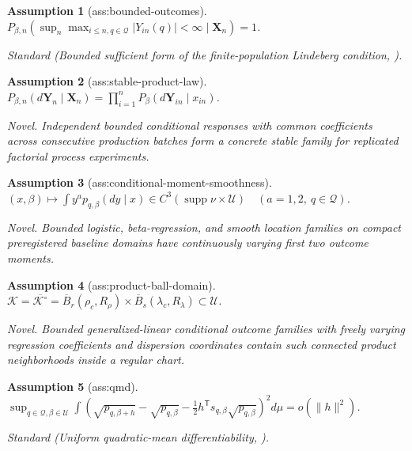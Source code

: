 \documentclass{article}
\newtheorem{assumption}{Assumption}
\begin{document}
\begin{assumption}[ass:bounded-outcomes]\label{ass:bounded-outcomes}
\(P_{\beta,n}(\sup_n\max_{i\le n,q\in\mathcal Q}|Y_{in}(q)|<\infty\mid\mathbf X_n)=1\).
\par\smallskip\noindent\emph{Standard} (Bounded sufficient form of the finite-population Lindeberg condition, \cite{LiDing2017FinitePopulationCLT}).
\end{assumption}

\begin{assumption}[ass:stable-product-law]\label{ass:stable-product-law}
\(P_{\beta,n}(d\mathbf Y_n\mid\mathbf X_n)=\prod_{i=1}^{n}P_{\beta}(d\mathbf Y_{in}\mid x_{in})\).
\par\smallskip\noindent\emph{Novel.} Independent bounded conditional responses with common coefficients across consecutive production batches form a concrete stable family for replicated factorial process experiments.
\end{assumption}

\begin{assumption}[ass:conditional-moment-smoothness]\label{ass:conditional-moment-smoothness}
\((x,\beta)\mapsto\int y^a p_{q,\beta}(dy\mid x)\in C^3(\operatorname{supp}\nu\times\mathcal U)\quad(a=1,2,\ q\in\mathcal Q)\).
\par\smallskip\noindent\emph{Novel.} Bounded logistic, beta-regression, and smooth location families on compact preregistered baseline domains have continuously varying first two outcome moments.
\end{assumption}

\begin{assumption}[ass:product-ball-domain]\label{ass:product-ball-domain}
\(\mathcal K=\overline{\mathcal K^{\circ}}=\overline B_r(\rho_c,R_{\rho})\times\overline B_s(\lambda_c,R_{\lambda})\subset\mathcal U\).
\par\smallskip\noindent\emph{Novel.} Bounded generalized-linear conditional outcome families with freely varying regression coefficients and dispersion coordinates contain such connected product neighborhoods inside a regular chart.
\end{assumption}

\begin{assumption}[ass:qmd]\label{ass:qmd}
\(\sup_{q\in\mathcal Q,\beta\in\mathcal U}\int\left(\sqrt{p_{q,\beta+h}}-\sqrt{p_{q,\beta}}-\tfrac12h^{\mathsf T}s_{q,\beta}\sqrt{p_{q,\beta}}\right)^2d\mu=o(\lVert h\rVert^2)\).
\par\smallskip\noindent\emph{Standard} (Uniform quadratic-mean differentiability, \cite{VanDerVaart1998AsymptoticStatistics}).
\end{assumption}
\end{document}
